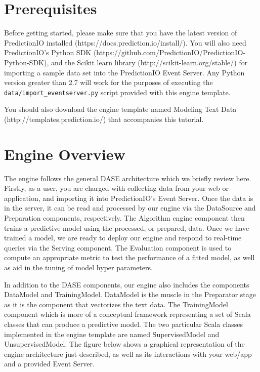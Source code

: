 \documentclass[a4paper,12pt]{article}
\renewcommand{\tt}[1]{\texttt{#1}}
\newcommand{\3}{\left}
\newcommand{\4}{\right}
\renewcommand{\-}[1]{{}^{-#1}}
\begin{document}
\section*{Prerequisites}

Before getting started, please make sure that you have the latest version of PredictionIO installed (https://docs.prediction.io/install/). You will also need PredictionIO's Python SDK (https://github.com/PredictionIO/PredictionIO-Python-SDK), and the Scikit learn library (http://scikit-learn.org/stable/) for importing a sample data set into the PredictionIO Event Server. Any Python version greater than 2.7 will work for the purposes of executing the \tt{data/import\_eventserver.py} script provided with this engine template.

You should also download the engine template named Modeling Text Data (http://templates.prediction.io/) that accompanies this tutorial.

\section*{Engine Overview}

The engine follows the general DASE architecture which we briefly review here. Firstly, as a user, you are charged with collecting data from your web or application, and importing it into PredictionIO's Event Server. Once the data is in the server, it  can be read and processed by our engine via the DataSource and Preparation components, respectively. The Algorithm engine component then trains a predictive model using the processed, or prepared, data. Once we have trained a model, we are ready to deploy our engine and respond to real-time queries via the Serving component. The Evaluation component is used to compute an appropriate metric to test the performance of a fitted model, as well as aid in the tuning of model hyper parameters. 

In addition to the DASE components, our engine also includes the components DataModel and TrainingModel. DataModel is the muscle in the Preparator stage as it is the component that vectorizes the text data. The TrainingModel component which is more of a conceptual framework representing a set of Scala classes that can produce a predictive model. The two particular Scala classes implemented in the engine template are named SupervisedModel and UnsupervisedModel. The figure below shows a graphical representation of the engine architecture just described, as well as its interactions with your web/app and a provided Event Server.
\end{document}
